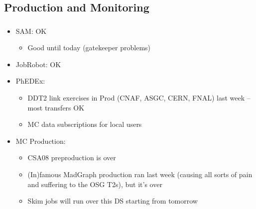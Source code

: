 \documentclass{beamer}
\begin{document}
\subsection{Production and Monitoring}
\begin{frame}
\frametitle{}
\begin{itemize}
    \item SAM: OK
    \begin{itemize}
        \item Good until today (gatekeeper problems)
    \end{itemize}
    \item JobRobot: OK 
    \item PhEDEx:
    \begin{itemize}
        \item DDT2 link exercises in Prod (CNAF, ASGC, CERN, FNAL) last week -- most transfers OK
        \item MC data subscriptions for local users
    \end{itemize}
    \item MC Production:
    \begin{itemize}
        \item CSA08 preproduction is over
        \item (In)famous MadGraph production ran last week (causing all sorts of pain and suffering to the OSG T2s), but it's over
        \item Skim jobs will run over this DS starting from tomorrow
    \end{itemize}
\end{itemize}
\end{frame}
\end{document}

